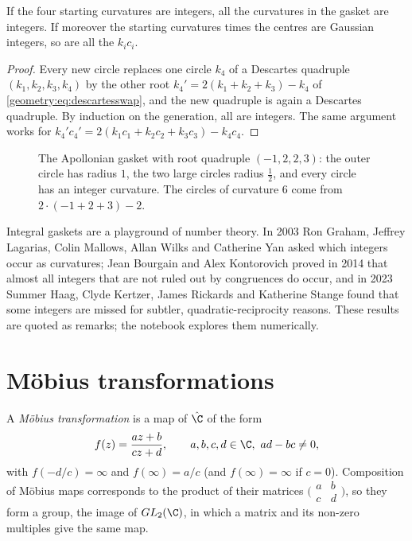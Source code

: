 \begin{corollary}\label{geometry:cor:integral}
If the four starting curvatures are integers, all the curvatures in the gasket are integers. If moreover the starting curvatures times
the centres are Gaussian integers, so are all the $k_ic_i$.
\end{corollary}
\begin{proof}
Every new circle replaces one circle $k_4$ of a Descartes quadruple $(k_1,k_2,k_3,k_4)$ by the other root $k_4'=2(k_1+k_2+k_3)-k_4$ of
\eqref{geometry:eq:descartesswap}, and the new quadruple is again a Descartes quadruple. By induction on the generation, all are integers. The same
argument works for $k_4'c_4'=2(k_1c_1+k_2c_2+k_3c_3)-k_4c_4$.
\end{proof}

\begin{figure}[ht]
\centering
{}
\caption{The Apollonian gasket with root quadruple $(-1,2,2,3)$: the outer circle has radius $1$, the two large circles radius $\frac12$, and every
circle has an integer curvature. The circles of curvature $6$ come from $2\cdot(-1+2+3)-2$.}
\label{geometry:fig:gasket}
\end{figure}

Integral gaskets are a playground of number theory. In 2003 Ron Graham, Jeffrey Lagarias, Colin Mallows, Allan Wilks and Catherine Yan
asked which integers occur as curvatures; Jean Bourgain and Alex Kontorovich proved in 2014 that almost all integers that are not ruled out by
congruences do occur, and in 2023 Summer Haag, Clyde Kertzer, James Rickards and Katherine Stange found that some integers are missed for
subtler, quadratic-reciprocity reasons. These results are quoted as remarks; the notebook explores them numerically.

\section{M\"obius transformations}

A \emph{M\"obius transformation} is a map of $\hat{\C}$ of the form
\[
f(z)=\frac{az+b}{cz+d},\qquad a,b,c,d\in\C,\ ad-bc\ne0,
\]
with $f(-d/c)=\infty$ and $f(\infty)=a/c$ (and $f(\infty)=\infty$ if $c=0$). Composition of M\"obius maps corresponds to the product of their
matrices $\bigl(\begin{smallmatrix}a&b\\c&d\end{smallmatrix}\bigr)$, so they form a group, the image of $GL_2(\C)$, in which a matrix and its non-zero
multiples give the same map.

